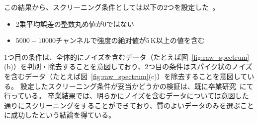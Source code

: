 この結果から、スクリーニング条件としては以下の2つを設定した~\cite{goto2021bachelor}。
\begin{itemize}
    \item 2乗平均誤差の整数丸め値が0ではない
    \item $5000-10000$チャンネルで強度の絶対値が$5\, \mathrm{K}$以上の値を含む
\end{itemize} \par
1つ目の条件は、全体的にノイズを含むデータ（たとえば図~\ref{fig:raw_spectrum}(b)）を判別・除去することを意図しており、2つ目の条件はスパイク状のノイズを含むデータ（たとえば図~\ref{fig:raw_spectrum}(c)）を除去することを意図している。
設定したスクリーニング条件が妥当かどうかの検証は、既に卒業研究~\cite{goto2021bachelor}にて行っている。
卒業結果では、明らかにノイズを含むデータについては意図した通りにスクリーニングをすることができており、質のよいデータのみを選ぶことに成功したという結論を得ている。


